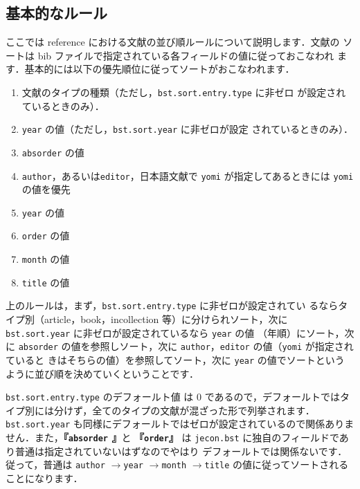 \documentclass[article]{jlreq}
\begin{document}
\subsection{基本的なルール}

ここでは reference における文献の並び順ルールについて説明します．文献の
ソートは bib ファイルで指定されている各フィールドの値に従っておこなわれ
ます．基本的には以下の優先順位に従ってソートがおこなわれます．
\begin{enumerate}
 \item 文献のタイプの種類（ただし，\texttt{bst.sort.entry.type} に非ゼロ
       が設定されているときのみ）．
 \item \texttt{year} の値（ただし，\texttt{bst.sort.year} に非ゼロが設定
       されているときのみ）．
 \item \texttt{absorder} の値
 \item \texttt{author}，あるいは\texttt{editor}，日本語文献で
       \texttt{yomi} が指定してあるときには \texttt{yomi} の値を優先
 \item \texttt{year} の値
 \item \texttt{order} の値
 \item \texttt{month} の値
 \item \texttt{title} の値
\end{enumerate}

上のルールは，まず，\texttt{bst.sort.entry.type} に非ゼロが設定されてい
るならタイプ別（article，book，incollection 等）に分けられソート，次に 
\texttt{bst.sort.year} に非ゼロが設定されているなら \texttt{year} の値 
（年順）にソート，次に \texttt{absorder} の値を参照しソート，次に 
\texttt{author}，\texttt{editor} の値（\texttt{yomi} が指定されていると
きはそちらの値）を参照してソート，次に \texttt{year} の値でソートという
ように並び順を決めていくということです．

\texttt{bst.sort.entry.type} のデフォールト値 は 0 であるので，デフォールトではタ
イプ別には分けず，全てのタイプの文献が混ざった形で列挙されます．
\texttt{bst.sort.year} も同様にデフォールトではゼロが設定されているので関係ありま
せん．また，\textbf{『\texttt{absorder} 』}と \textbf {『\texttt{order}』} は
\texttt{jecon.bst} に独自のフィールドであり普通は指定されていないはずなのでやはり
デフォールトでは関係ないです．従って，普通は \texttt{author}
$\rightarrow$\texttt{year} $\rightarrow$\texttt{month}
$\rightarrow$\texttt{title} の値に従ってソートされることになります．
\end{document}
